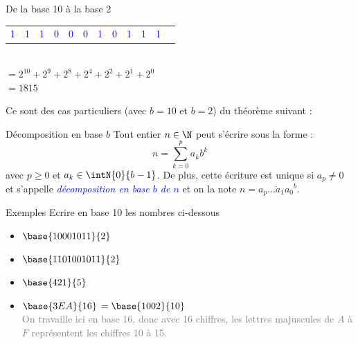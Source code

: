 \documentclass[10pt]{beamer}
\begin{document}
\begin{frame}{\Ctitle}{\stitle}
\begin{block}{De la base 10 à la base 2}
\begin{itemize}
\begin{tabular}{p{0.4cm}|p{0.4cm}|p{0.4cm}|p{0.4cm}|p{0.4cm}|p{0.4cm}|p{0.4cm}|p{0.4cm}|p{0.4cm}|p{0.4cm}|p{0.4cm}c}
				      \hline
				      \textcolor{blue}{1}                          & \textcolor{blue}{1}                         & \textcolor{blue}{1}                         & \textcolor{blue}{0}                         & \textcolor{blue}{0}                         & \textcolor{blue}{0}                         & \textcolor{blue}{1}                         & \textcolor{blue}{0}                         & \textcolor{blue}{1}                         & \textcolor{blue}{1}                         & \textcolor{blue}{1}                           \\
			      \end{tabular}
			       \\ \textcolor{BrickRed}{$\scriptstyle{= 2^{10} + 2^9 + 2^8 + 2^4 + 2^2 + 2^1 + 2^0}$}
			      \onslide<3-> \\ \textcolor{BrickRed}{$\scriptstyle{= 1815}$}
		\end{itemize}
	\end{block}
\end{frame}

\begin{frame}{\Ctitle}{\stitle}
	Ce sont des cas particuliers (avec $b=10$ et $b=2$) du théorème suivant  :
	\begin{alertblock}{Décomposition en base $b$}
		Tout entier $n \in \N$ peut s'écrire sous la forme :
		$$ n = \sum_{k=0}^{p} a_k b^k$$
		avec $p \geq 0$ et $a_k \in \intN{0}{b-1}$. De plus, cette écriture est unique si $a_p \neq 0$ et s'appelle \textcolor{blue}{\textit{décomposition en base $b$ de $n$}} et on la note $n = \overline{a_p\dots a_1 a_0}^b$.
	\end{alertblock}
\end{frame}


\begin{frame}{\Ctitle}{\stitle}
	\begin{exampleblock}{Exemples}
		Ecrire en base 10 les nombres ci-dessous
		\begin{itemize}
			\item<1-> $\base{10001011}{2}$
				\onslide<6->{\textcolor{OliveGreen}{$=\base{139}{10}$}}
			\item <2-> $\base{1101001011}{2}$
			      \onslide<7->{\textcolor{OliveGreen}{$=\base{843}{10}$} }
			\item<3-> $\base{421}{5}$
				\onslide<8->{\textcolor{OliveGreen}{$=\base{111}{10}$}}
			\item<4-> $\base{3EA}{16}$
				\onslide<9-> {\textcolor{OliveGreen}{$=\base{1002}{10}$}}\\
				\onslide<5->\textcolor{gray}{\small On travaille ici en base 16, donc avec 16 chiffres, les lettres majuscules de $A$ à $F$ représentent les \og{} chiffres \fg{} 10 à 15.}  \\
		\end{itemize}
	\end{exampleblock}
\end{frame}
\end{document}
